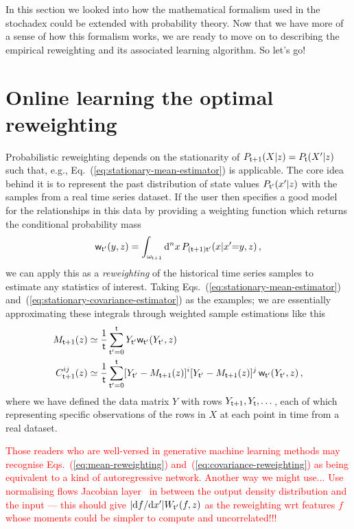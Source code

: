 In this section we looked into how the mathematical formalism used in the stochadex could be extended with probability theory. Now that we have more of a sense of how this formalism works, we are ready to move on to describing the empirical reweighting and its associated learning algorithm. So let's go!

\section{\sffamily Online learning the optimal reweighting}

Probabilistic reweighting depends on the stationarity of $P_{{\sf t}+1}(X\vert z)=P_{{\sf t}}(X'\vert z)$ such that, e.g., Eq.~(\ref{eq:stationary-mean-estimator}) is applicable. The core idea behind it is to represent the past distribution of state values $P_{{\sf t}'}(x'\vert z)$ with the samples from a real time series dataset. If the user then specifies a good model for the relationships in this data by providing a weighting function which returns the conditional probability mass
\begin{align}
{\sf w}_{{\sf t}'}(y,z) = \int_{\omega_{{\sf t}+1}} {\rm d}^nx \, P_{({\sf t}+1){\sf t}'}(x\vert x'{=}y,z) \,,  
\end{align}
we can apply this as a \emph{reweighting} of the historical time series samples to estimate any statistics of interest. Taking Eqs.~(\ref{eq:stationary-mean-estimator}) and~(\ref{eq:stationary-covariance-estimator}) as the examples; we are essentially approximating these integrals through weighted sample estimations like this
\begin{align}
M_{{\sf t}+1}(z) &\simeq \frac{1}{{\sf t}}\sum^{{\sf t}}_{{\sf t}'=0}Y_{{\sf t}'} {\sf w}_{{\sf t}'}(Y_{{\sf t}'},z) \label{eq:mean-reweighting} \\
C^{ij}_{{\sf t}+1}(z) &\simeq \frac{1}{{\sf t}}\sum^{{\sf t}}_{{\sf t}'=0}[Y_{{\sf t}'}-M_{{\sf t}+1}(z)]^i[Y_{{\sf t}'}-M_{{\sf t}+1}(z)]^j \, {\sf w}_{{\sf t}'}(Y_{{\sf t}'},z) \label{eq:covariance-reweighting} \,,
\end{align}
where we have defined the data matrix $Y$ with rows $Y_{{\sf t}+1}, Y_{{\sf t}}, \dots$, each of which representing specific observations of the rows in $X$ at each point in time from a real dataset.

\textcolor{red}{
Those readers who are well-versed in generative machine learning methods may recognise Eqs.~(\ref{eq:mean-reweighting}) and~(\ref{eq:covariance-reweighting}) as being equivalent to a kind of autoregressive network. Another way we might use... 
Use normalising flows Jacobian layer~\cite{kobyzev2020normalizing} in between the output density distribution and the input --- this should give $\vert {\rm d} f/{\rm d}x' \vert W_{{\sf t}'}(f,z)$ as the reweighting wrt features $f$ whose moments could be simpler to compute and uncorrelated!!!}


